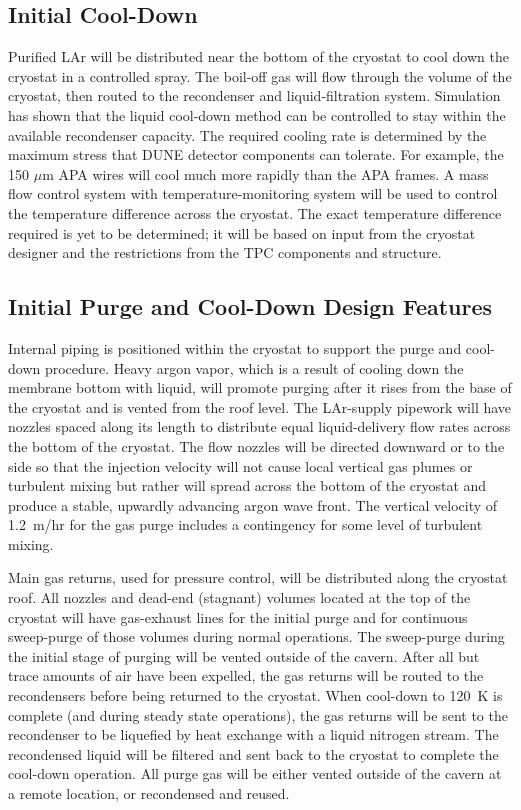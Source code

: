 \subsection{Initial Cool-Down}

Purified LAr will be distributed near
the bottom of the cryostat to cool down the cryostat in a controlled spray.
The boil-off gas will flow through the volume of the cryostat, then
routed to the recondenser and liquid-filtration system. Simulation
has shown that the liquid cool-down method can
be controlled to stay within the available recondenser capacity. The required cooling rate
is determined by the maximum stress that DUNE detector components can
tolerate. For example, the 150 $\mu$m APA wires will cool much more rapidly than the APA frames.
A mass flow control system with temperature-monitoring system will be used to control the
temperature difference across the cryostat. The exact temperature difference required is yet to
be determined; it will be based on input from the cryostat designer and the restrictions from
the TPC components and structure.

\subsection{Initial Purge and Cool-Down Design Features}

Internal piping is positioned within the cryostat to support the purge and cool-down procedure.  Heavy argon vapor, which is a result of cooling down the membrane bottom with liquid, will promote purging after it rises from the base of the cryostat and is vented from the roof level.  The LAr-supply pipework will have nozzles spaced along its length to 
 distribute equal liquid-delivery flow rates across the bottom of the cryostat.  The flow nozzles will be directed downward or to the side so that the injection velocity will not cause local vertical gas plumes or turbulent mixing but rather will spread across the bottom of the cryostat and produce a stable, upwardly advancing argon wave front. The vertical velocity of 1.2~m/hr for the gas purge includes a contingency for some level of turbulent mixing. 

Main gas returns, used for pressure control, will be distributed along the cryostat roof.  All nozzles and dead-end (stagnant) volumes located at the top of the cryostat will have gas-exhaust lines for the initial purge and for continuous sweep-purge of those volumes during normal operations.  
The sweep-purge during the initial stage of purging will be vented outside of the cavern.  After all but trace amounts of air have been expelled, the gas returns will be routed to the recondensers before being returned to the cryostat.  When cool-down to 120~K is complete (and during steady state operations), the gas returns will be sent to the recondenser to be liquefied by heat exchange with a liquid nitrogen stream.  The recondensed liquid will be filtered and sent back to the cryostat to complete the cool-down operation.
All purge gas will be either vented outside of the cavern at a remote location, or recondensed and reused. 

